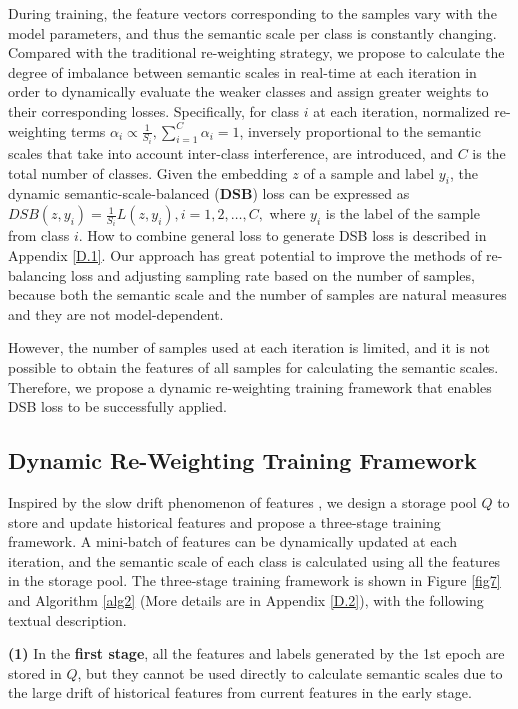 \documentclass[10pt]{article} %
\begin{document}
During training, the feature vectors corresponding to the samples vary with the model parameters, and thus the semantic scale per class is constantly changing. Compared with the traditional re-weighting strategy, we propose to calculate the degree of imbalance between semantic scales in real-time at each iteration in order to dynamically evaluate the weaker classes and assign greater weights to their corresponding losses. Specifically, for class $i$ at each iteration, normalized re-weighting terms ${\alpha _i} \propto \frac{1}{{{S_i}}},\sum\limits_{i = 1}^C {{\alpha _i}} = 1$, inversely proportional to the semantic scales that take into account inter-class interference, are introduced, and $C$ is the total number of classes. Given the embedding $z$ of a sample and label $y_{i}$, the dynamic semantic-scale-balanced (\textbf{DSB}) loss can be expressed as $D\!S\!B( {z,{y_i}} ) = \frac{1}{{{S_i}}}L( {z,{y_i}} ),i = 1,2, \ldots ,C,$ where ${y_i}$ is the label of the sample from class $i$. How to combine general loss to generate DSB loss is described in Appendix \ref{D.1}. Our approach has great potential to improve the methods of re-balancing loss and adjusting sampling rate based on the number of samples, because both the semantic scale and the number of samples are natural measures and they are not model-dependent.

However, the number of samples used at each iteration is limited, and it is not possible to obtain the features of all samples for calculating the semantic scales. Therefore, we propose a dynamic re-weighting training framework that enables DSB loss to be successfully applied.

\subsection{Dynamic Re-Weighting Training Framework\label{4.2}}

Inspired by the slow drift phenomenon of features \cite {paper25,paper72}, we design a storage pool $Q$ to store and update historical features and propose a three-stage training framework. A mini-batch of features can be dynamically updated at each iteration, and the semantic scale of each class is calculated using all the features in the storage pool. The three-stage training framework is shown in Figure \ref{fig7} and Algorithm \ref{alg2} (More details are in Appendix \ref{D.2}), with the following textual description.

\textbf{(1)} In the \textbf{first stage}, all the features and labels generated by the 1st epoch are stored in $Q$, but they cannot be used directly to calculate semantic scales due to the large drift of historical features from current features in the early stage.
\end{document}
